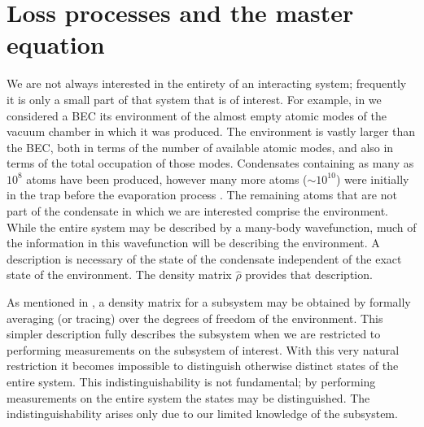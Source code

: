 \section{Loss processes and the master equation}

We are not always interested in the entirety of an interacting system; frequently it is only a small part of that system that is of interest.  For example, in  we considered a BEC its environment of the almost empty atomic modes of the vacuum chamber in which it was produced.  The environment is vastly larger than the BEC, both in terms of the number of available atomic modes, and also in terms of the total occupation of those modes.  Condensates containing as many as $10^8$  atoms have been produced, however many more atoms ($\sim 10^{10}$) were initially in the trap before the evaporation process \citep{Streed:2006}.  The remaining atoms that are not part of the condensate in which we are interested comprise the environment.  While the entire system may be described by a many-body wavefunction, much of the information in this wavefunction will be describing the environment.  A description is necessary of the state of the condensate independent of the exact state of the environment.  The density matrix $\hat{\rho}$ provides that description.

As mentioned in , a density matrix for a subsystem may be obtained by formally averaging (or tracing) over the degrees of freedom of the environment.  This simpler description fully describes the subsystem when we are restricted to performing measurements on the subsystem of interest.  With this very natural restriction it becomes impossible to distinguish otherwise distinct states of the entire system.  This indistinguishability is not fundamental; by performing measurements on the entire system the states may be distinguished.  The indistinguishability arises only due to our limited knowledge of the subsystem.

